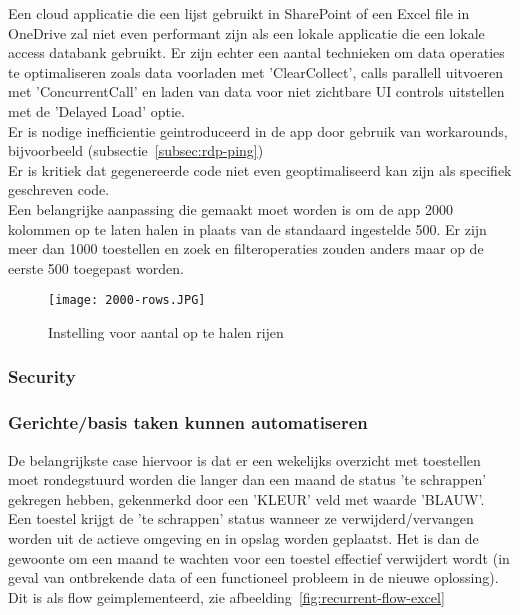 Een cloud applicatie die een lijst gebruikt in SharePoint of een Excel file in OneDrive zal niet even performant zijn als een lokale applicatie die een lokale access databank gebruikt. Er zijn echter een aantal technieken om data operaties te optimaliseren zoals data voorladen met 'ClearCollect', calls parallell uitvoeren met 'ConcurrentCall' en laden van data voor niet zichtbare UI controls uitstellen met de 'Delayed Load' optie. \autocite{Andaloussi2018}\\
Er is nodige inefficientie geintroduceerd in de app door gebruik van workarounds, bijvoorbeeld (subsectie~\ref{subsec:rdp-ping})\\
Er is kritiek dat gegenereerde code niet even geoptimaliseerd kan zijn als specifiek geschreven code. \autocite{Shiah2018}\\
Een belangrijke aanpassing die gemaakt moet worden is om de app 2000 kolommen op te laten halen in plaats van de standaard ingestelde 500. Er zijn meer dan 1000 toestellen en zoek en filteroperaties zouden anders maar op de eerste 500 toegepast worden.

\begin{figure}[h!]
    \texttt{[image: 2000-rows.JPG]}
    \caption{Instelling voor aantal op te halen rijen}
    \label{fig:2000-rows}
\end{figure}

\subsubsection{Security}


\subsubsection{Gerichte/basis taken kunnen automatiseren}

De belangrijkste case hiervoor is dat er een wekelijks overzicht met toestellen moet rondegstuurd worden die langer dan een maand de status 'te schrappen' gekregen hebben, gekenmerkd door een 'KLEUR' veld met waarde 'BLAUW'. Een toestel krijgt de 'te schrappen' status wanneer ze verwijderd/vervangen worden uit de actieve omgeving en in opslag worden geplaatst. Het is dan de gewoonte om een maand te wachten voor een toestel effectief verwijdert wordt (in geval van ontbrekende data of een functioneel probleem in de nieuwe oplossing).\\
Dit is als flow geimplementeerd, zie afbeelding~\ref{fig:recurrent-flow-excel}


